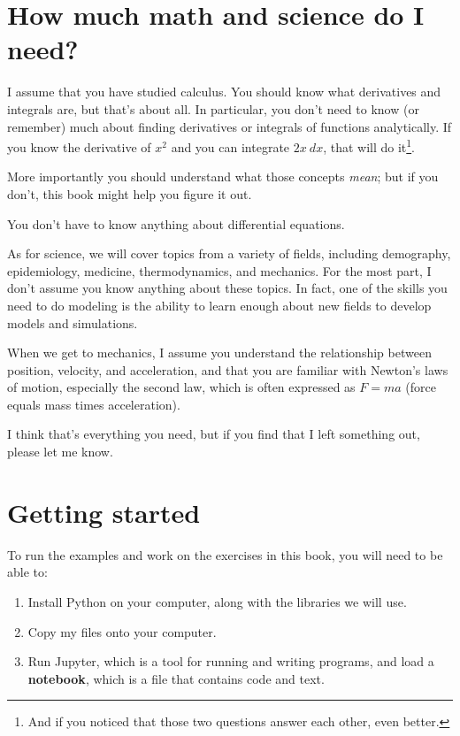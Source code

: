 \documentclass[12pt]{book}
\theoremstyle{exercise}
\begin{document}
\section{How much math and science do I need?} 

I assume that you have studied calculus.  You should know what derivatives and integrals are, but that's about all.  In particular, you don't need to know (or remember) much about finding derivatives or integrals of functions analytically.  If you know the derivative of $x^2$ and you can integrate $2x~dx$, that will do it\footnote{And if you noticed that those two questions answer each other, even better.}.

More importantly you should understand what those concepts {\em mean};  but if you don't, this book might help you figure it out.

You don't have to know anything about differential equations.

As for science, we will cover topics from a variety of fields, including demography, epidemiology, medicine, thermodynamics, and mechanics. For the most part, I don't assume you know anything about these topics.  In fact, one of the skills you need to do modeling is the ability to learn enough about new fields to develop models and simulations.

When we get to mechanics, I assume you understand the relationship between position, velocity, and acceleration, and that you are familiar with Newton's laws of motion, especially the second law, which is often expressed as $F = ma$ (force equals mass times acceleration).

I think that's everything you need, but if you find that I left something out, please let me know.


\section{Getting started}
\label{code}

To run the examples and work on the exercises in this book, you will need to be able to:

\begin{enumerate}

\item Install Python on your computer, along with the libraries we will use.

\item Copy my files onto your computer.

\item Run Jupyter, which is a tool for running and writing programs, and load a {\bf notebook}, which is a file that contains code and text.

\end{enumerate}
\end{document}
